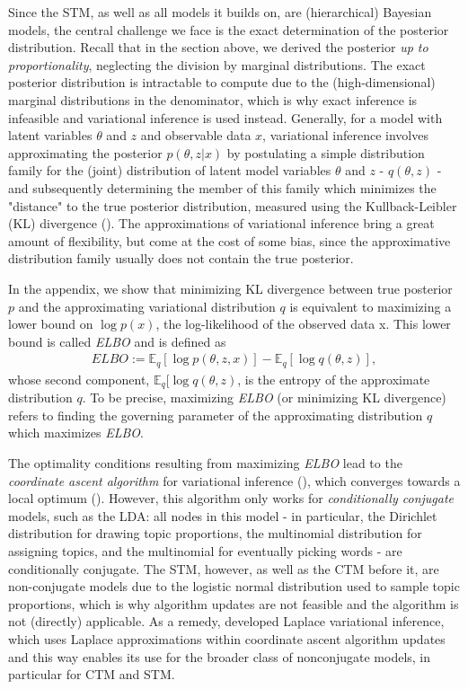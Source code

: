 \documentclass[12pt]{article}
\begin{document}
Since the STM, as well as all models it builds on, are (hierarchical) Bayesian models, the central challenge we face is the exact determination of the posterior distribution. Recall that in the section above, we derived the posterior \textit{up to proportionality}, neglecting the division by marginal distributions. The exact posterior distribution is intractable to compute due to the (high-dimensional) marginal distributions in the denominator, which is why exact inference is infeasible and variational inference is used instead. Generally, for a model with latent variables $\theta$ and $z$ and observable data $x$, variational inference involves approximating the posterior $p(\theta,z|x)$ by postulating a simple distribution family for the (joint) distribution of latent model variables $\theta$ and $z$ - $q(\theta,z)$ - and subsequently determining the member of this family which minimizes the "distance" to the true posterior distribution, measured using the Kullback-Leibler (KL) divergence (\citealp{wang2013variational}). The approximations of variational inference bring a great amount of flexibility, but come at the cost of some bias, since the approximative distribution family usually does not contain the true posterior.

In the appendix, we show that minimizing KL divergence between true posterior $p$ and the approximating variational distribution $q$ is equivalent to maximizing a lower bound on $\log p(x)$, the log-likelihood of the observed data x. This lower bound is called \textit{ELBO} and is defined as
\begin{align*}
ELBO := \mathbb{E}_q[\log p(\theta,z,x)] - \mathbb{E}_q[\log q(\theta,z)],
\end{align*}
whose second component, $\mathbb{E}_q[\log q(\theta,z)$, is the entropy of the approximate distribution $q$. To be precise, maximizing \textit{ELBO} (or minimizing KL divergence) refers to finding the governing parameter of the approximating distribution $q$ which maximizes \textit{ELBO}.

The optimality conditions resulting from maximizing \textit{ELBO} lead to the \textit{coordinate ascent algorithm} for variational inference (\citealp{wang2013variational}), which converges towards a local optimum (\citealp{bishop2006pattern}). However, this algorithm only works for \textit{conditionally conjugate} models, such as the LDA: all nodes in this model - in particular, the Dirichlet distribution for drawing topic proportions, the multinomial distribution for assigning topics, and the multinomial for eventually picking words - are conditionally conjugate. The STM, however, as well as the CTM before it, are non-conjugate models due to the logistic normal distribution used to sample topic proportions, which is why algorithm updates are not feasible and the algorithm is not (directly) applicable. As a remedy, \cite{wang2013variational} developed Laplace variational inference, which uses Laplace approximations within coordinate ascent algorithm updates and this way enables its use for the broader class of nonconjugate models, in particular for CTM and STM.
\end{document}

